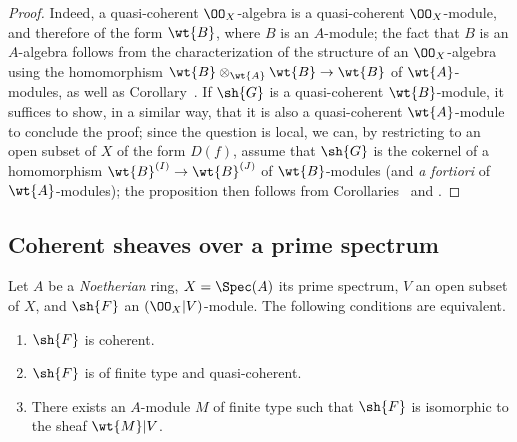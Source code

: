 \begin{proof}
\label{proof-1.1.4.3}
Indeed, a quasi-coherent $\OO_X$-algebra is a quasi-coherent $\OO_X$-module, and therefore of the form $\wt{B}$, where $B$ is an $A$-module;
the fact that $B$ is an $A$-algebra follows from the characterization of the structure of an $\OO_X$-algebra using the homomorphism $\wt{B}\otimes_\wt{A}\wt{B}\to\wt{B}$ of $\wt{A}$-modules, as well as Corollary~.
If $\sh{G}$ is a quasi-coherent $\wt{B}$-module, it suffices to show, in a similar way, that it is also a quasi-coherent $\wt{A}$-module to conclude the proof;
since the question is local, we can, by restricting to an open subset of $X$ of the form $D(f)$, assume that $\sh{G}$ is the cokernel of a homomorphism $\wt{B}^{(I)}\to\wt{B}^{(J)}$ of $\wt{B}$-modules (and \emph{a fortiori} of $\wt{A}$-modules);
the proposition then follows from Corollaries~ and .
\end{proof}

\subsection{Coherent sheaves over a prime spectrum}
\label{subsection:coh-over-spec}

\begin{thm}[1.5.1]
\label{1.1.5.1}
Let $A$ be a \emph{Noetherian} ring, $X=\Spec(A)$ its prime spectrum, $V$ an open subset of $X$, and $\sh{F}$ an $(\OO_X|V)$-module.
The following conditions are equivalent.
\begin{enumerate}[label=\emph{(\alph*)}]
  \item $\sh{F}$ is coherent.
  \item $\sh{F}$ is of finite type and quasi-coherent.
  \item There exists an $A$-module $M$ of finite type such that $\sh{F}$ is isomorphic to the sheaf $\wt{M}|V$.
\end{enumerate}
\end{thm}

